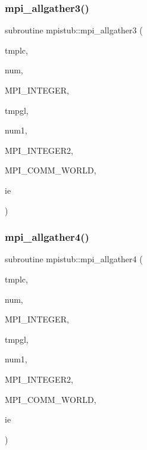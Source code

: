 \subsubsection{\texorpdfstring{mpi\_allgather3()}{mpi\_allgather3()}}
{\footnotesize\ttfamily subroutine mpistub\+::mpi\+\_\+allgather3 (\begin{DoxyParamCaption}\item[{integer, dimension(\+:)}]{tmplc,  }\item[{}]{num,  }\item[{}]{M\+P\+I\+\_\+\+I\+N\+T\+E\+G\+ER,  }\item[{integer, dimension(\+:)}]{tmpgl,  }\item[{}]{num1,  }\item[{}]{M\+P\+I\+\_\+\+I\+N\+T\+E\+G\+E\+R2,  }\item[{}]{M\+P\+I\+\_\+\+C\+O\+M\+M\+\_\+\+W\+O\+R\+LD,  }\item[{}]{ie }\end{DoxyParamCaption})}

\mbox{\label{namespacempistub_a2b8f9c4bef9676116ba1eeb6b4e72af5}} 
\subsubsection{\texorpdfstring{mpi\_allgather4()}{mpi\_allgather4()}}
{\footnotesize\ttfamily subroutine mpistub\+::mpi\+\_\+allgather4 (\begin{DoxyParamCaption}\item[{integer}]{tmplc,  }\item[{}]{num,  }\item[{}]{M\+P\+I\+\_\+\+I\+N\+T\+E\+G\+ER,  }\item[{integer, dimension(\+:)}]{tmpgl,  }\item[{}]{num1,  }\item[{}]{M\+P\+I\+\_\+\+I\+N\+T\+E\+G\+E\+R2,  }\item[{}]{M\+P\+I\+\_\+\+C\+O\+M\+M\+\_\+\+W\+O\+R\+LD,  }\item[{}]{ie }\end{DoxyParamCaption})}

\mbox{\label{namespacempistub_afa6d7737a2157021051c7c4e7c159079}} 
